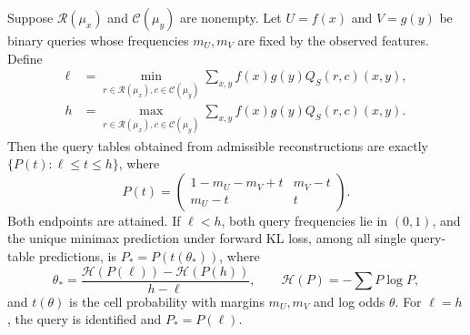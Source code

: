 \begin{proposition}
\label{prop:all-marker-interval}
Suppose $\mathcal R(\mu_x)$ and $\mathcal C(\mu_y)$ are nonempty. Let
$U=f(x)$ and $V=g(y)$ be binary queries whose frequencies $m_U,m_V$ are fixed
by the observed features. Define
\begin{align*}
 \ell&=\min_{r\in\mathcal R(\mu_x),c\in\mathcal C(\mu_y)}
       \sum_{x,y}f(x)g(y)Q_S(r,c)(x,y),\\
 h&=\max_{r\in\mathcal R(\mu_x),c\in\mathcal C(\mu_y)}
       \sum_{x,y}f(x)g(y)Q_S(r,c)(x,y).
\end{align*}
Then the query tables obtained from admissible reconstructions are
exactly $\{P(t):\ell\leq t\leq h\}$, where
\[
 P(t)=\begin{pmatrix}1-m_U-m_V+t&m_V-t\\m_U-t&t\end{pmatrix}.
\]
Both endpoints are attained. If $\ell<h$, both query frequencies lie in
$(0,1)$, and the unique minimax prediction under forward KL loss, among all
single query-table predictions, is $P_*=P(t(\theta_*))$, where
\[
 \theta_*=\frac{\mathcal H(P(\ell))-\mathcal H(P(h))}{h-\ell},
 \qquad \mathcal H(P)=-\sum P\log P,
\]
and $t(\theta)$ is the cell probability with margins $m_U,m_V$ and log odds
$\theta$. For $\ell=h$, the query is identified and $P_*=P(\ell)$.
\end{proposition}

